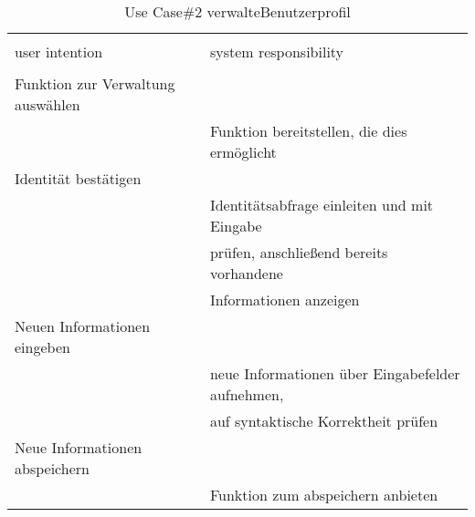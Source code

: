 \begin{table}[H]
\caption{Use Case\#2 verwalteBenutzerprofil }
\centering
\begin{tabular}{l l}
\\ [-0.5ex]

\hline\hline
\\ [-0.5ex]
user intention & system responsibility
\\ [1.5ex]
\hline
\\ [-0.5ex]
Funktion zur Verwaltung auswählen   &                                      \\[1ex]
                           & Funktion bereitstellen, die dies ermöglicht      \\[1ex]
Identität bestätigen          &                                      \\[1ex]
                           & Identitätsabfrage einleiten und mit Eingabe      \\[1ex]
                           & prüfen, anschließend bereits vorhandene          \\[1ex] 
                           & Informationen anzeigen                     \\[1ex] 
Neuen Informationen eingeben     &                                      \\[1ex] 
                           & neue Informationen über Eingabefelder aufnehmen,    \\[1ex]
                           & auf syntaktische Korrektheit prüfen           \\[1ex]
Neue Informationen abspeichern      &                                      \\[1ex]
                           & Funktion zum abspeichern anbieten             \\[1ex]
\hline
\end{tabular}
\label{tab:profilbearbeitenUC}
\end{table}

